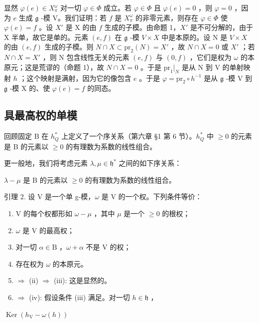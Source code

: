 显然 \(\varphi(e) \in X_{\pi}^{\omega}\) 对一切 \(\varphi \in \Phi\) 成立。若 \(\varphi \in \Phi\) 且 \(\varphi(e) = 0\) ，则 \(\varphi = 0\) ，因为 \(e\) 生成 \(\mathfrak{g}\) -模 V。我们证明：若 \(f\) 是 \(X_{\pi}^{\omega}\) 的非零元素，则存在 \(\varphi \in \Phi\) 使 \(\varphi(e) = f\) 。设 \(X'\) 是 X 的由 \(f\) 生成的子模。由命题 1，\(X'\) 是不可分解的，由于 X 半单，故它是单的。元素 \((e, f)\) 在 \(\mathfrak{g}\) -模 \(V \times X\) 中是本原的。设 N 是 \(V \times X\) 的由 \((e, f)\) 生成的子模。则 \(N \cap X \subset \mathrm{pr}_2(N) = X'\) ，故 \(N \cap X = 0\) 或 \(X'\) ；若 \(N \cap X = X'\) ，则 N 包含线性无关的元素 \((e, f)\) 与 \((0, f)\) ，它们是权为 \(\omega\) 的本原元；这是荒谬的（命题 1），故 \(N \cap X = 0\) 。于是 \(\mathrm{pr}_1|_{N}\) 是从 N 到 V 的单射映射 \(h\) ；这个映射是满射，因为它的像包含 \(e\) 。于是 \(\varphi = \mathrm{pr}_2 \circ h^{-1}\) 是从 \(\mathfrak{g}\) -模 V 到 \(\mathfrak{g}\) -模 X 的、使 \(\varphi(e) = f\) 的同态。

\subsection{具最高权的单模}

回顾固定 B 在 \(h_{Q}^{*}\) 上定义了一个序关系（第六章 §1 第 6 节）。\(h_{Q}^{*}\) 中 \(\geq 0\) 的元素是 B 的元素以 \(\geq 0\) 的有理数为系数的线性组合。

更一般地，我们将考虑元素 \(\lambda, \mu \in \mathfrak{h}^*\) 之间的如下序关系：

\(\lambda - \mu\) 是 B 的元素以 \(\geq 0\) 的有理数为系数的线性组合。

引理 2. 设 V 是一个单 g-模，\(\omega\) 是 V 的一个权。下列条件等价：

\begin{enumerate}
\def\labelenumi{(\roman{enumi})}
\item
  V 的每个权都形如 \(\omega -\mu\) ，其中 \(\mu\) 是一个 \(\geq 0\) 的根权；
\item
  \(\omega\) 是 V 的最高权；
\item
  对一切 \(\alpha \in \mathrm{B}\) ，\(\omega + \alpha\) 不是 V 的权；
\item
  存在权为 \(\omega\) 的本原元。
\item
  \(\Longrightarrow\) (ii) \(\Longrightarrow\) (iii): 这是显然的。
\item
  \(\Longrightarrow\) (iv): 假设条件 (iii) 满足。对一切 \(h\in \mathfrak{h}\) ，
\end{enumerate}

\(\operatorname {Ker}(h_{\mathrm{V}} - \omega (h))\)

